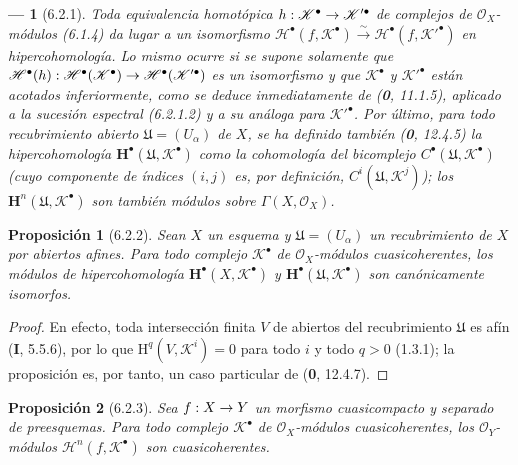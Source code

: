 \documentclass[10pt,oneside,openany]{book}
\theoremstyle{egaenv}\newtheorem*{env}{---}
\theoremstyle{egastatement}
\newtheorem*{proposition}{Proposición}
\theoremstyle{egadescription}
\renewcommand{\to}{\mathchoice{\longrightarrow}{\rightarrow}{\rightarrow}{\rightarrow}}
\begin{document}
\begin{env}[6.2.1]
Toda \emph{equivalencia homotópica} $h:\mathscr K^\bullet\to\mathscr K'^\bullet$ de complejos de
$\mathscr O_X$-módulos (6.1.4) da lugar a un \emph{isomorfismo}
$\mathscr H^\bullet(f,\mathscr K^\bullet)\xrightarrow{\sim}
\mathscr H^\bullet(f,\mathscr K'^\bullet)$ en hipercohomología. Lo mismo ocurre
si se supone solamente que
$\mathscr H^\bullet(h):\mathscr H^\bullet(\mathscr K^\bullet)\to
\mathscr H^\bullet(\mathscr K'^\bullet)$ es un \emph{isomorfismo} y que
$\mathscr K^\bullet$ y $\mathscr K'^\bullet$ están \emph{acotados inferiormente},
como se deduce inmediatamente de (\textbf 0, 11.1.5), aplicado a la sucesión espectral
(6.2.1.2) y a su análoga para $\mathscr K'^\bullet$. Por último, para todo
recubrimiento abierto $\mathfrak U=(U_\alpha)$ de $X$, se ha definido también
(\textbf 0, 12.4.5) la hipercohomología
$\mathbf H^\bullet(\mathfrak U,\mathscr K^\bullet)$ como la cohomología del
bicomplejo $C^\bullet(\mathfrak U,\mathscr K^\bullet)$ (cuyo componente de
índices $(i,j)$ es, por definición,
$C^i(\mathfrak U,\mathscr K^j)$); los
$\mathbf H^n(\mathfrak U,\mathscr K^\bullet)$ son también módulos sobre
$\Gamma(X,\mathscr O_X)$.
\end{env}

\begin{proposition}[6.2.2]
Sean $X$ un esquema y $\mathfrak U=(U_\alpha)$ un recubrimiento de $X$ por
abiertos afines. Para todo complejo $\mathscr K^\bullet$ de
$\mathscr O_X$-módulos cuasicoherentes, los módulos de hipercohomología
$\mathbf H^\bullet(X,\mathscr K^\bullet)$ y
$\mathbf H^\bullet(\mathfrak U,\mathscr K^\bullet)$ son canónicamente
isomorfos.
\end{proposition}

\begin{proof}
En efecto, toda intersección finita $V$ de abiertos del recubrimiento
$\mathfrak U$ es afín (\textbf I, 5.5.6), por lo que
$\mathrm H^q(V,\mathscr K^i)=0$ para todo $i$ y todo $q>0$ (1.3.1); la
proposición es, por tanto, un caso particular de (\textbf 0, 12.4.7).
\end{proof}

\begin{proposition}[6.2.3]
Sea $f:X\to Y$ un morfismo cuasicompacto y separado de preesquemas. Para todo
complejo $\mathscr K^\bullet$ de $\mathscr O_X$-módulos cuasicoherentes, los
$\mathscr O_Y$-módulos $\mathscr H^n(f,\mathscr K^\bullet)$ son
cuasicoherentes.
\end{proposition}
\end{document}
